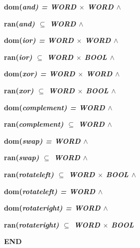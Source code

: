 \begin{sloppypar}
\hspace*{0.10in}\bf dom\rm (\it and\rm ) \rm = \it WORD $\times$ \it WORD  $\land$ 

\hspace*{0.10in}\bf ran\rm (\it and\rm )  $\subseteq$  \it WORD  $\land$ 

\hspace*{0.10in}\bf dom\rm (\it ior\rm ) \rm = \it WORD $\times$ \it WORD  $\land$ 

\hspace*{0.10in}\bf ran\rm (\it ior\rm )  $\subseteq$  \it WORD $\times$ \bf BOOL  $\land$ 

\hspace*{0.10in}\bf dom\rm (\it xor\rm ) \rm = \it WORD $\times$ \it WORD  $\land$ 

\hspace*{0.10in}\bf ran\rm (\it xor\rm )  $\subseteq$  \it WORD $\times$ \bf BOOL  $\land$ 

\hspace*{0.10in}\bf dom\rm (\it complement\rm ) \rm = \it WORD  $\land$ 

\hspace*{0.10in}\bf ran\rm (\it complement\rm )  $\subseteq$  \it WORD  $\land$ 

\hspace*{0.10in}\bf dom\rm (\it swap\rm ) \rm = \it WORD  $\land$ 

\hspace*{0.10in}\bf ran\rm (\it swap\rm )  $\subseteq$  \it WORD  $\land$ 

\hspace*{0.10in}\bf ran\rm (\it rotateleft\rm )  $\subseteq$  \it WORD $\times$ \bf BOOL  $\land$ 

\hspace*{0.10in}\bf dom\rm (\it rotateleft\rm ) \rm = \it WORD  $\land$ 

\hspace*{0.10in}\bf dom\rm (\it rotateright\rm ) \rm = \it WORD  $\land$ 

\hspace*{0.10in}\bf ran\rm (\it rotateright\rm )  $\subseteq$  \it WORD $\times$ \bf BOOL

\bf END

\newpage
\end{sloppypar}
